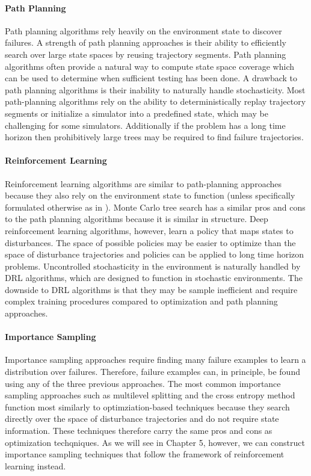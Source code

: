 \paragraph{Path Planning} Path planning algorithms rely heavily on the environment state to discover failures. A strength of path planning approaches is their ability to efficiently search over large state spaces by reusing trajectory segments. Path planning algorithms often provide a natural way to compute state space coverage which can be used to determine when sufficient testing has been done. A drawback to path planning algorithms is their inability to naturally handle stochasticity. Most path-planning algorithms rely on the ability to deterministically replay trajectory segments or initialize a simulator into a predefined state, which may be challenging for some simulators.  Additionally if the problem has a long time horizon then prohibitively large trees may be required to find failure trajectories. 


\paragraph{Reinforcement Learning} Reinforcement learning algorithms are similar to path-planning approaches because they also rely on the environment state to function (unless specifically formulated otherwise as in \textcite{koren2019adaptive}). Monte Carlo tree search has a similar pros and cons to the path planning algorithms because it is similar in structure. Deep reinforcement learning algorithms, however, learn a policy that maps states to disturbances. The space of possible policies may be easier to optimize than the space of disturbance trajectories and policies can be applied to long time horizon problems. Uncontrolled stochasticity in the environment is naturally handled by DRL algorithms, which are designed to function in stochastic environments. The downside to DRL algorithms is that they may be sample inefficient and require complex training procedures compared to optimization and path planning approaches. 


\paragraph{Importance Sampling}
Importance sampling approaches require finding many failure examples to learn a distribution over failures. Therefore, failure examples can, in principle, be found using any of the three previous approaches. The most common importance sampling approaches such as multilevel splitting and the cross entropy method function most similarly to optimziation-based techniques because they search directly over the space of disturbance trajectories and do not require state information. These techniques therefore carry the same pros and cons as optimization techqniques. As we will see in Chapter 5, however, we can construct importance sampling techniques that follow the framework of reinforcement learning instead. 

